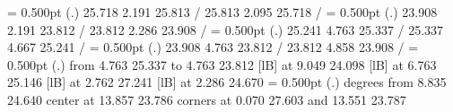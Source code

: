 {{}%
%
%
\linethickness= 0.500pt
\setplotsymbol ({\thinlinefont .})
{\color[rgb]{0,0,0} 25.718  2.191 25.813 /
 25.813  2.095 25.718 /
}%
%
%
\linethickness= 0.500pt
\setplotsymbol ({\thinlinefont .})
{\color[rgb]{0,0,0} 23.908  2.191 23.812 /
 23.812  2.286 23.908 /
}%
%
%
\linethickness= 0.500pt
\setplotsymbol ({\thinlinefont .})
{\color[rgb]{0,0,0} 25.241  4.763 25.337 /
 25.337  4.667 25.241 /
}%
%
%
\linethickness= 0.500pt
\setplotsymbol ({\thinlinefont .})
{\color[rgb]{0,0,0} 23.908  4.763 23.812 /
 23.812  4.858 23.908 /
}%
%
%
\linethickness= 0.500pt
\setplotsymbol ({\thinlinefont .})
{\color[rgb]{0,0,0}\putrule from  4.763 25.337 to  4.763 23.812
}%
%
%
 [lB] at  9.049 24.098
%
%
 [lB] at  6.763 25.146
%
%
 [lB] at  2.762 27.241
%
%
 [lB] at  2.286 24.670
%
%
\linethickness= 0.500pt
\setplotsymbol ({\thinlinefont .})
{\color[rgb]{0,0,0} degrees from  8.835 24.640 center at 13.857 23.786
}%
\linethickness=0pt
\putrectangle corners at  0.070 27.603 and 13.551 23.787
\endpicture}
